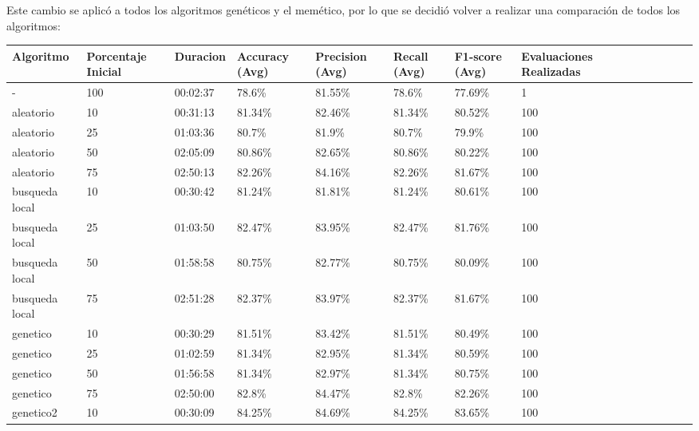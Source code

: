 Este cambio se aplicó a todos los algoritmos genéticos y el memético, por lo que se decidió volver a realizar una
comparación de todos los algoritmos:
\begin{sidewaystable}[htp]
    \centering
    \begin{adjustbox}{width=\linewidth}
        \begin{tabular}{llllllllllllll}
        \toprule
        \textbf{Algoritmo} & \textbf{Porcentaje Inicial} & \textbf{Duracion} & \textbf{Accuracy (Avg)} &
        \textbf{Precision (Avg)} & \textbf{Recall (Avg)} & \textbf{F1-score (Avg)} & \textbf{Evaluaciones Realizadas} \\
        \midrule
        - & 100 & 00:02:37 & 78.6\% & 81.55\% & 78.6\% & 77.69\% & 1 \\
        \rowcolor{gray!10}aleatorio & 10 & 00:31:13 & 81.34\% & 82.46\% & 81.34\% & 80.52\% & 100 \\
        \rowcolor{gray!10}aleatorio & 25 & 01:03:36 & 80.7\% & 81.9\% & 80.7\% & 79.9\% & 100 \\
        \rowcolor{gray!10}aleatorio & 50 & 02:05:09 & 80.86\% & 82.65\% & 80.86\% & 80.22\% & 100 \\
        \rowcolor{gray!10}aleatorio & 75 & 02:50:13 & 82.26\% & 84.16\% & 82.26\% & 81.67\% & 100 \\
        \rowcolor{gray!40}busqueda local & 10 & 00:30:42 & 81.24\% & 81.81\% & 81.24\% & 80.61\% & 100 \\
        \rowcolor{gray!40}busqueda local & 25 & 01:03:50 & 82.47\% & 83.95\% & 82.47\% & 81.76\% & 100 \\
        \rowcolor{gray!40}busqueda local & 50 & 01:58:58 & 80.75\% & 82.77\% & 80.75\% & 80.09\% & 100 \\
        \rowcolor{gray!40}busqueda local & 75 & 02:51:28 & 82.37\% & 83.97\% & 82.37\% & 81.67\% & 100 \\
        \rowcolor{gray!10}genetico & 10 & 00:30:29 & 81.51\% & 83.42\% & 81.51\% & 80.49\% & 100 \\
        \rowcolor{gray!10}genetico & 25 & 01:02:59 & 81.34\% & 82.95\% & 81.34\% & 80.59\% & 100 \\
        \rowcolor{gray!10}genetico & 50 & 01:56:58 & 81.34\% & 82.97\% & 81.34\% & 80.75\% & 100 \\
        \rowcolor{gray!10}genetico & 75 & 02:50:00 & 82.8\% & 84.47\% & 82.8\% & 82.26\% & 100 \\
        \rowcolor{gray!40}genetico2 & 10 & 00:30:09 & 84.25\% & 84.69\% & 84.25\% & 83.65\% & 100 \\

\end{tabular}
\end{adjustbox}
\end{sidewaystable}

